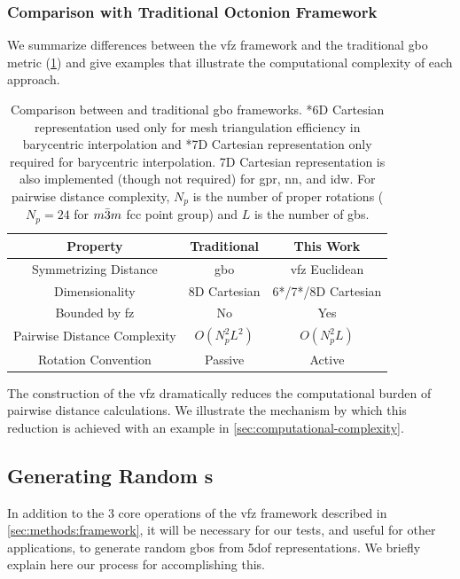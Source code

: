 \documentclass[final,twocolumn,12pt]{elsarticle}
\begin{document}
\subsubsection{Comparison with Traditional Octonion Framework}

We summarize differences between the \gls{vfz} framework and the traditional \gls{gbo} metric (\cref{tab:closed-mesh-comparison}) and give examples that illustrate the computational complexity of each approach.

\begin{table}
\caption{Comparison between  and traditional \gls{gbo} frameworks. *6D Cartesian representation used only for mesh triangulation efficiency in barycentric interpolation and *7D Cartesian representation only required for barycentric interpolation. 7D Cartesian representation is also implemented (though not required) for \gls{gpr}, \gls{nn}, and \gls{idw}. For pairwise distance complexity, $N_p$ is the number of proper rotations ($N_p=24$ for $m\Bar{3}m$ \gls{fcc} point group) and $L$ is the number of \glspl{gb}.}
\centering
\begin{tabular}{ccc}
\toprule
Property & Traditional & This Work \\
\midrule
Symmetrizing Distance & \gls{gbo} & \gls{vfz} Euclidean \\
Dimensionality & 8D Cartesian & 6*/7*/8D Cartesian \\
Bounded by \gls{fz} & No & Yes \\
Pairwise Distance Complexity & $O(N_p^2L^2)$ & $O(N_p^2L)$ \\
Rotation Convention & Passive & Active \\
\bottomrule
\end{tabular}
\label{tab:closed-mesh-comparison}
\end{table}

The construction of the \gls{vfz} dramatically reduces the computational burden of pairwise distance calculations. We illustrate the mechanism by which this reduction is achieved with an example in \cref{sec:computational-complexity}.

\subsection{Generating Random s}
\label{sec:methods:rand}
In addition to the 3 core operations of the \gls{vfz} framework described in \cref{sec:methods:framework}, it will be necessary for our tests, and useful for other applications, to generate random \glspl{gbo} from \gls{5dof} representations. We briefly explain here our process for accomplishing this. 
\end{document}
